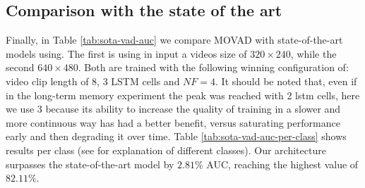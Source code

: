 \subsection{Comparison with the state of the art}
Finally, in Table \ref{tab:sota-vad-auc} we compare MOVAD with state-of-the-art models using.
The first is using in input a videos size of $320\times240$, while the second $640\times480$.
Both are trained with the following winning configuration of: video clip length of 8, 3 LSTM cells and $\mathit{NF}=4$.
It should be noted that, even if in the long-term memory experiment the peak was reached with 2 lstm cells, here we use 3 because its ability to increase the quality of training in a slower and more continuous way has had a better benefit, versus saturating performance early and then degrading it over time.
Table \ref{tab:sota-vad-auc-per-class} shows results per class (see \cite{9712446} for explanation of different classes).
Our architecture surpasses the state-of-the-art model by $2.81\%$ AUC, reaching the highest value of $82.11\%$.
